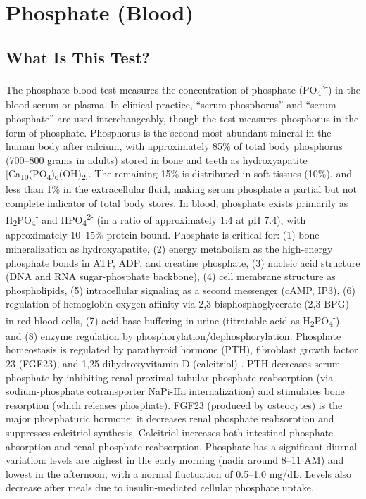 \chapter{Phosphate (Blood)}

\section*{What Is This Test?}
The phosphate blood test measures the concentration of phosphate (PO\textsubscript{4}\textsuperscript{3-}) in the blood serum or plasma. In clinical practice, ``serum phosphorus'' and ``serum phosphate'' are used interchangeably, though the test measures phosphorus in the form of phosphate. Phosphorus is the second most abundant mineral in the human body after calcium, with approximately 85\% of total body phosphorus (700--800 grams in adults) stored in bone and teeth as hydroxyapatite [Ca\textsubscript{10}(PO\textsubscript{4})\textsubscript{6}(OH)\textsubscript{2}]. The remaining 15\% is distributed in soft tissues (10\%), and less than 1\% in the extracellular fluid, making serum phosphate a partial but not complete indicator of total body stores. In blood, phosphate exists primarily as H\textsubscript{2}PO\textsubscript{4}\textsuperscript{-} and HPO\textsubscript{4}\textsuperscript{2-} (in a ratio of approximately 1:4 at pH 7.4), with approximately 10--15\% protein-bound. Phosphate is critical for: (1) bone mineralization as hydroxyapatite, (2) energy metabolism as the high-energy phosphate bonds in ATP, ADP, and creatine phosphate, (3) nucleic acid structure (DNA and RNA sugar-phosphate backbone), (4) cell membrane structure as phospholipids, (5) intracellular signaling as a second messenger (cAMP, IP3), (6) regulation of hemoglobin oxygen affinity via 2,3-bisphosphoglycerate (2,3-BPG) in red blood cells, (7) acid-base buffering in urine (titratable acid as H\textsubscript{2}PO\textsubscript{4}\textsuperscript{-}), and (8) enzyme regulation by phosphorylation/dephosphorylation. Phosphate homeostasis is regulated by parathyroid hormone (PTH), fibroblast growth factor 23 (FGF23), and 1,25-dihydroxyvitamin D (calcitriol) \cite{berndt2007phosphatonins}. PTH decreases serum phosphate by inhibiting renal proximal tubular phosphate reabsorption (via sodium-phosphate cotransporter NaPi-IIa internalization) and stimulates bone resorption (which releases phosphate). FGF23 (produced by osteocytes) is the major phosphaturic hormone: it decreases renal phosphate reabsorption and suppresses calcitriol synthesis. Calcitriol increases both intestinal phosphate absorption and renal phosphate reabsorption. Phosphate has a significant diurnal variation: levels are highest in the early morning (nadir around 8--11 AM) and lowest in the afternoon, with a normal fluctuation of 0.5--1.0 mg/dL. Levels also decrease after meals due to insulin-mediated cellular phosphate uptake.

